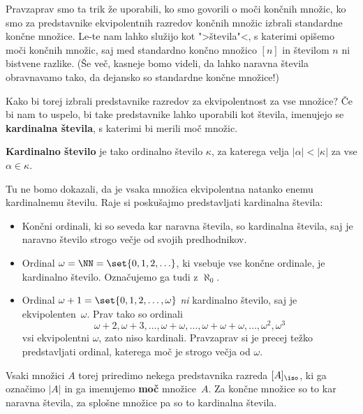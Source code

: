 Pravzaprav smo ta trik že uporabili, ko smo govorili o moči končnih množic, ko smo za predstavnike ekvipolentnih razredov končnih množic izbrali standardne končne množice. Le-te nam lahko služijo kot ">števila"<, s katerimi opišemo moči končnih množic, saj med standardno končno množico $[n]$ in številom $n$ ni bistvene razlike. (Še več, kasneje bomo videli, da lahko naravna števila obravnavamo tako, da dejansko so standardne končne množice!)

Kako bi torej izbrali predstavnike razredov za ekvipolentnost za vse množice?
Če bi nam to uspelo, bi take predstavnike lahko uporabili kot števila, imenujejo se \textbf{kardinalna števila}, s katerimi bi merili moč množic.

\begin{definicija}
  \textbf{Kardinalno število} je tako ordinalno število $\kappa$, za katerega velja $|\alpha| < |\kappa|$ za vse $\alpha \in \kappa$.
\end{definicija}

\begin{zgled}
  Tu ne bomo dokazali, da je vsaka množica ekvipolentna natanko enemu kardinalnemu številu. Raje si poskušajmo predstavljati kardinalna števila:
  \begin{itemize}
  \item Končni ordinali, ki so seveda kar naravna števila, so kardinalna števila, saj je naravno število strogo večje od
    svojih predhodnikov.
  \item Ordinal $\omega = \NN = \set{0, 1, 2, \ldots}$, ki vsebuje vse končne ordinale, je kardinalno število. Označujemo ga tudi z $\aleph_0$.
  \item Ordinal $\omega + 1 = \set{0, 1, 2, \ldots, \omega}$ \emph{ni} kardinalno število, saj je ekvipolenten~$\omega$. Prav tako so ordinali
    \begin{equation*}
      \omega + 2, \omega + 3, \ldots, \omega + \omega, \ldots, \omega + \omega + \omega, \ldots, \omega^2, \omega^3
    \end{equation*}
    vsi ekvipolentni $\omega$, zato niso kardinali. Pravzaprav si je precej težko predstavljati ordinal, katerega moč je strogo večja od $\omega$.
  \end{itemize}
\end{zgled}

Vsaki množici $A$ torej priredimo nekega predstavnika razreda $[A]_{\iso}$, ki ga označimo $|A|$ in ga imenujemo \textbf{moč} množice~$A$. Za končne množice so to kar naravna števila, za splošne množice pa so to kardinalna števila.


